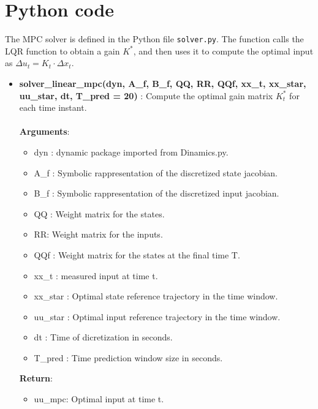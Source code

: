 \section*{Python code}
The MPC solver is defined in the Python file \texttt{solver.py}. The function calls the LQR function to obtain a gain \( K^* \), and then uses it to compute the optimal input as \( \Delta u_t = K_t \cdot \Delta x_t \).

\begin{itemize}
    \item \textbf{solver\_linear\_mpc(dyn, A\_f, B\_f, QQ, RR, QQf, xx\_t, xx\_star, uu\_star, dt, T\_pred = 20) }: Compute the optimal gain matrix $K_t^*$ for each time instant.\\\\
    \textbf{Arguments}:
    \begin{itemize}
        \item dyn : dynamic package imported from Dinamics.py.
        \item A\_f : Symbolic rappresentation of the discretized state jacobian.
        \item B\_f : Symbolic rappresentation of the discretized input jacobian.
        \item QQ : Weight matrix for the states.
        \item RR: Weight matrix for the inputs.
        \item QQf : Weight matrix for the states at the final time T.
        \item xx\_t : measured input at time t.
        \item xx\_star : Optimal state reference trajectory in the time window.
        \item uu\_star : Optimal input reference trajectory in the time window.
        \item dt : Time of dicretization in seconds.
        \item T\_pred : Time prediction window size in seconds.
    \end{itemize}
    \textbf{Return}:
    \begin{itemize}
        \item uu\_mpc: Optimal input at time t.
    \end{itemize}
\end{itemize}